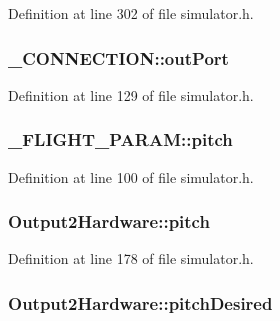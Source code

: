 Definition at line 302 of file simulator.\-h.

\hypertarget{group___h_i_t_l_plugin_gaaba6cf28320e1105f7320ea8a21df15b}{
\subsubsection[{out\-Port}]{ \-\_\-\-C\-O\-N\-N\-E\-C\-T\-I\-O\-N\-::out\-Port}}\label{group___h_i_t_l_plugin_gaaba6cf28320e1105f7320ea8a21df15b}


Definition at line 129 of file simulator.\-h.

\hypertarget{group___h_i_t_l_plugin_gaff7712b3622dba7f5178549057fdac4e}{
\subsubsection[{pitch}]{ \-\_\-\-F\-L\-I\-G\-H\-T\-\_\-\-P\-A\-R\-A\-M\-::pitch}}\label{group___h_i_t_l_plugin_gaff7712b3622dba7f5178549057fdac4e}


Definition at line 100 of file simulator.\-h.

\hypertarget{group___h_i_t_l_plugin_gaf92e2c90046782813af0a2fdd6e48bf4}{
\subsubsection[{pitch}]{ Output2\-Hardware\-::pitch}}\label{group___h_i_t_l_plugin_gaf92e2c90046782813af0a2fdd6e48bf4}


Definition at line 178 of file simulator.\-h.

\hypertarget{group___h_i_t_l_plugin_ga29bbb9f720db0b7039f92a3afcb785a3}{
\subsubsection[{pitch\-Desired}]{ Output2\-Hardware\-::pitch\-Desired}}\label{group___h_i_t_l_plugin_ga29bbb9f720db0b7039f92a3afcb785a3}


